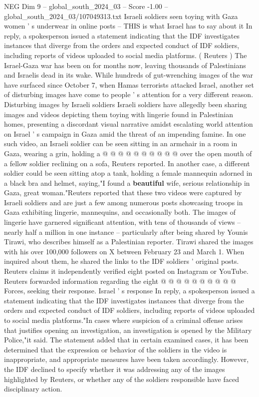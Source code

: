 \begin{textsample}{NEG Dim 9 – global\_south\_2024\_03 – Score -1.00 – global\_south\_2024\_03/107049313.txt}  \label{ex:f9_neg_412}
Israeli soldiers seen toying with Gaza women ' s underwear in online posts -- THIS is what Israel has to say about it In reply, a spokesperson issued a statement indicating that the IDF investigates instances that diverge from the orders and expected conduct of IDF soldiers, including reports of videos uploaded to social media platforms. ( Reuters ) The Israel-Gaza war has been on for months now, leaving thousands of Palestinians and Israelis dead in its wake.
While hundreds of gut-wrenching images of the war have surfaced since October 7, when Hamas terrorists attacked Israel, another set of disturbing images have come to people ' s attention for a very different reason.
Disturbing images by Israeli soldiers Israeli soldiers have allegedly been sharing images and videos depicting them toying with lingerie found in Palestinian homes, presenting a discordant visual narrative amidst escalating world attention on Israel ' s campaign in Gaza amid the threat of an impending famine.
In one such video, an Israeli soldier can be seen sitting in an armchair in a room in Gaza, wearing a grin, holding a @ @ @ @ @ @ @ @ @ @ over the open mouth of a fellow soldier reclining on a sofa, Reuters reported.
In another case, a different soldier could be seen sitting atop a tank, holding a female mannequin adorned in a black bra and helmet, saying,"I found a \textbf{beautiful} wife, serious relationship in Gaza, great woman."Reuters reported that these two videos were captured by Israeli soldiers and are just a few among numerous posts showcasing troops in Gaza exhibiting lingerie, mannequins, and occasionally both.
The images of lingerie have garnered significant attention, with tens of thousands of views -- nearly half a million in one instance -- particularly after being shared by Younis Tirawi, who describes himself as a Palestinian reporter.
Tirawi shared the images with his over 100,000 followers on X between February 23 and March 1.
When inquired about them, he shared the links to the IDF soldiers ' original posts.
Reuters claims it independently verified eight posted on Instagram or YouTube.
Reuters forwarded information regarding the eight @ @ @ @ @ @ @ @ @ @ Forces, seeking their response.
Israel ' s response In reply, a spokesperson issued a statement indicating that the IDF investigates instances that diverge from the orders and expected conduct of IDF soldiers, including reports of videos uploaded to social media platforms."In cases where suspicion of a criminal offense arises that justifies opening an investigation, an investigation is opened by the Military Police,"it said.
The statement added that in certain examined cases, it has been determined that the expression or behavior of the soldiers in the video is inappropriate, and appropriate measures have been taken accordingly.
However, the IDF declined to specify whether it was addressing any of the images highlighted by Reuters, or whether any of the soldiers responsible have faced disciplinary action.

\end{textsample}
